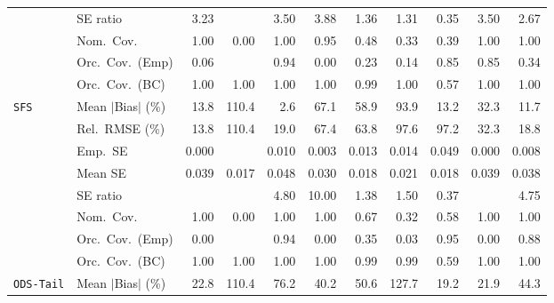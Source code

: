 \begin{landscape}
\begin{longtable}{llrrrrrrrrr}
 & SE ratio & 3.23 &  & 3.50 & 3.88 & \cellcolor{ranktwo}1.36 & \cellcolor{rankone}1.31 & \cellcolor{rankthree}0.35 & 3.50 & 2.67 \\
 & Nom.\ Cov. & \cellcolor{ranktwo}1.00 & 0.00 & \cellcolor{ranktwo}1.00 & \cellcolor{rankone}0.95 & \cellcolor{rankthree}0.48 & 0.33 & 0.39 & \cellcolor{ranktwo}1.00 & \cellcolor{ranktwo}1.00 \\
 & Orc.\ Cov.\ (Emp) & 0.06 &  & \cellcolor{rankone}0.94 & 0.00 & 0.23 & 0.14 & \cellcolor{ranktwo}0.85 & \cellcolor{ranktwo}0.85 & \cellcolor{rankthree}0.34 \\
 & Orc.\ Cov.\ (BC) & \cellcolor{ranktwo}1.00 & \cellcolor{ranktwo}1.00 & \cellcolor{ranktwo}1.00 & \cellcolor{ranktwo}1.00 & \cellcolor{rankone}0.99 & \cellcolor{ranktwo}1.00 & \cellcolor{rankthree}0.57 & \cellcolor{ranktwo}1.00 & \cellcolor{ranktwo}1.00 \\
\addlinespace[2pt]
\quad \texttt{SFS} & Mean $|$Bias$|$ (\%) & 13.8 & 110.4 & \cellcolor{rankone}2.6 & 67.1 & 58.9 & 93.9 & \cellcolor{rankthree}13.2 & 32.3 & \cellcolor{ranktwo}11.7 \\
 & Rel.\ RMSE (\%) & \cellcolor{rankone}13.8 & 110.4 & \cellcolor{rankthree}19.0 & 67.4 & 63.8 & 97.6 & 97.2 & 32.3 & \cellcolor{ranktwo}18.8 \\
 & Emp.\ SE & 0.000 &  & 0.010 & 0.003 & 0.013 & 0.014 & 0.049 & 0.000 & 0.008 \\
 & Mean SE & 0.039 & 0.017 & 0.048 & 0.030 & 0.018 & 0.021 & 0.018 & 0.039 & 0.038 \\
 & SE ratio &  &  & 4.80 & 10.00 & \cellcolor{rankone}1.38 & \cellcolor{ranktwo}1.50 & \cellcolor{rankthree}0.37 &  & 4.75 \\
 & Nom.\ Cov. & \cellcolor{rankone}1.00 & 0.00 & \cellcolor{rankone}1.00 & \cellcolor{rankone}1.00 & \cellcolor{ranktwo}0.67 & 0.32 & \cellcolor{rankthree}0.58 & \cellcolor{rankone}1.00 & \cellcolor{rankone}1.00 \\
 & Orc.\ Cov.\ (Emp) & 0.00 &  & \cellcolor{ranktwo}0.94 & 0.00 & 0.35 & 0.03 & \cellcolor{rankone}0.95 & 0.00 & \cellcolor{rankthree}0.88 \\
 & Orc.\ Cov.\ (BC) & \cellcolor{ranktwo}1.00 & \cellcolor{ranktwo}1.00 & \cellcolor{ranktwo}1.00 & \cellcolor{ranktwo}1.00 & \cellcolor{rankone}0.99 & \cellcolor{rankone}0.99 & \cellcolor{rankthree}0.59 & \cellcolor{ranktwo}1.00 & \cellcolor{ranktwo}1.00 \\
\addlinespace[2pt]
\quad \texttt{ODS-Tail} & Mean $|$Bias$|$ (\%) & \cellcolor{rankthree}22.8 & 110.4 & 76.2 & 40.2 & 50.6 & 127.7 & \cellcolor{rankone}19.2 & \cellcolor{ranktwo}21.9 & 44.3 \\

\end{longtable}
\end{landscape}
